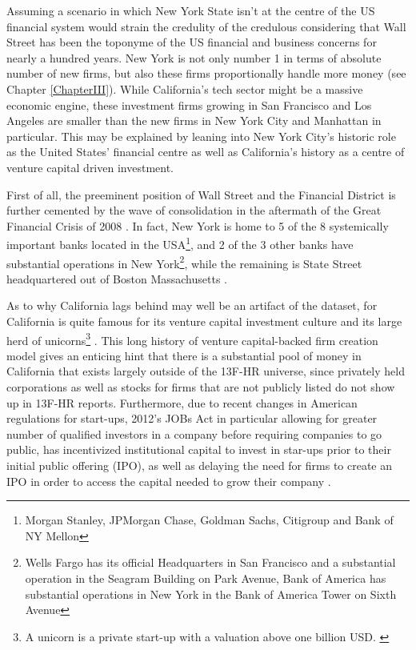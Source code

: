 Assuming a scenario in which New York State isn't at the centre of the US financial system would strain the credulity of the credulous considering that Wall Street has been the toponyme of the US financial and business concerns for nearly a hundred years.  New York is not only number 1 in terms of absolute number of new firms, but also these firms proportionally handle more money (see Chapter \ref{ChapterIII}).  While California's tech sector might be a massive economic engine, these investment firms growing in San Francisco and Los Angeles are smaller than the new firms in New York City and Manhattan in particular. This may be explained by leaning into New York City's historic role as the United States' financial centre as well as California's history as a centre of venture capital driven investment.  

First of all, the preeminent position of Wall Street and the Financial District is further cemented by the wave of consolidation in the aftermath of the Great Financial Crisis of 2008 \citep{wheelock2011banking}. In fact, New York is home to 5 of the 8 systemically important banks located in the USA\footnote{Morgan Stanley, JPMorgan Chase, Goldman Sachs, Citigroup and Bank of NY Mellon}, and 2 of the 3 other banks have substantial operations in New York\footnote{Wells Fargo has its official Headquarters in San Francisco and a substantial operation in the Seagram Building on Park Avenue,  Bank of America has substantial operations in New York in the Bank of America Tower on Sixth Avenue}, while the remaining is State Street headquartered out of Boston Massachusetts \citep{FSB2019}. 


As to why California lags behind may well be an artifact of the dataset, for California is quite famous for its venture capital investment culture \citep{greenventure2004} and its large herd of unicorns\footnote{A unicorn is a private start-up with a valuation above one billion USD. \citep{Lee2013}} \citep{kenney2019unicorns}. This long history of venture capital-backed firm creation model gives an enticing hint that there is a substantial pool of money in California that exists largely outside of the 13F-HR universe, since privately held corporations as well as stocks for firms that are not publicly listed do not show up in 13F-HR reports.  Furthermore, due to recent changes in American regulations for start-ups, 2012's JOBs Act in particular allowing for greater number of qualified investors in a company before requiring companies to go public, has incentivized institutional capital to invest in star-ups prior to their initial public offering (IPO), as well as delaying the need for firms to create an IPO in order to access the capital needed to grow their company \citep{kenney2019unicorns}.

